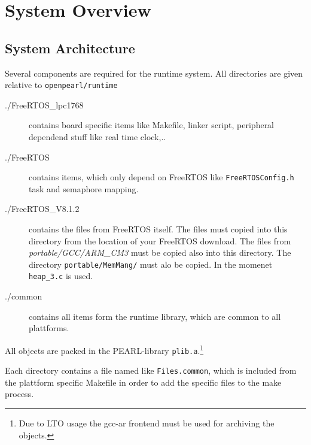 \section{System Overview}

\subsection{System Architecture}
Several components are required for the runtime system.
All directories are given relative to \verb|openpearl/runtime|

\begin{description}
\item[./FreeRTOS\_lpc1768] contains board specific items like
Makefile, linker script, peripheral dependend stuff like real time clock,..
\item[./FreeRTOS] contains items, which only depend on FreeRTOS like
 \verb|FreeRTOSConfig.h| task and semaphore mapping.
\item[./FreeRTOS\_V8.1.2] contains the files from FreeRTOS itself.
 The files must copied into this directory from the
  location of your FreeRTOS download. The files from 
  {\em portable/GCC/ARM\_CM3}  must be copied also into this directory.
  The directory \verb|portable/MemMang/| must alo be copied. 
  In the momenet \verb|heap_3.c| is used. 
\item[./common] contains all items form the runtime library, which are common
  to all plattforms.
\end{description}
All objects are packed in the PEARL-library \verb|plib.a|.\footnote{Due
 to LTO usage
the gcc-ar frontend must be used for archiving the objects.
}

Each directory contains a file named like \verb|Files.common|, which is
included from the plattform specific Makefile in order to add the 
specific files to the make process.

